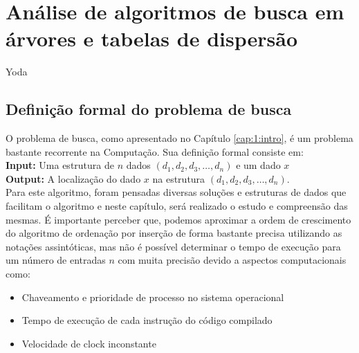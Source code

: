 
\chapter{Análise de algoritmos de busca em árvores e tabelas de dispersão}
\label{cap:3:desenvolvimento}

{Yoda}

\section{Definição formal do problema de busca}

O problema de busca, como apresentado no Capítulo \ref{cap:1:intro}, é um problema bastante recorrente na Computação.
Sua definição formal consiste em: \\

\textbf{Input: } Uma estrutura de $n$ dados $(d_1, d_2, d_3,\ldots, d_n)$ e um dado $x$ \\

\textbf{Output: } A localização do dado $x$ na estrutura $(d_1, d_2, d_3,\ldots, d_n)$. \\

Para este algoritmo, foram pensadas diversas soluções e estruturas de dados que facilitam o algoritmo 
e neste capítulo, será realizado o estudo e compreensão das mesmas. 
É importante perceber que, podemos aproximar a ordem de crescimento do algoritmo de ordenação
por inserção de forma bastante precisa utilizando as notações assintóticas, mas não é possível
determinar o tempo de execução para um número de entradas $n$ com muita precisão devido a aspectos
computacionais como:

\begin{itemize}
    \item Chaveamento e prioridade de processo no sistema operacional
    \item Tempo de execução de cada instrução do código compilado
    \item Velocidade de clock inconstante
\end{itemize}





